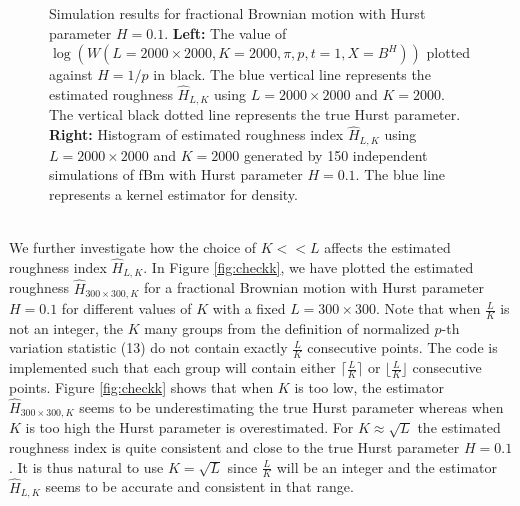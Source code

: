 \documentclass{article}
\begin{document}
\begin{figure}[htbp]
    \caption{Simulation results for fractional Brownian motion with Hurst parameter $H=0.1$. \textbf{Left:} The value of $\log(W(L=2000\times 2000, K=2000, \pi, p, t=1, X=B^H))$ plotted against $H=1/p$ in black. The blue vertical line represents the estimated roughness $\hat{H}_{L,K}$ using $L=2000\times 2000$ and $K=2000$. The vertical black dotted line represents the true Hurst parameter. \textbf{Right:} Histogram of estimated roughness index $\hat{H}_{L,K}$ using $L=2000\times 2000$ and $K=2000$ generated by 150 independent simulations of fBm with Hurst parameter $H=0.1$. The blue line represents a kernel estimator for density. }
    \label{fig:check2000}
\end{figure}\\
We further investigate how the choice of $K<<L$ affects the estimated roughness index $\hat{H}_{L,K}$. In Figure \ref{fig:checkk}, we have plotted the estimated roughness $\hat{H}_{300\times 300,K}$ for a fractional Brownian motion with Hurst parameter $H=0.1$ for different values of $K$ with a fixed $L=300\times 300$. Note that when $\frac{L}{K}$ is not an integer, the $K$ many groups from the definition of normalized $p$-th variation statistic (13) do not contain exactly $\frac{L}{K}$ consecutive points. The code is implemented such that each group will contain either $\lceil \frac{L}{K} \rceil$ or $\lfloor \frac{L}{K} \rfloor$ consecutive points. Figure \ref{fig:checkk} shows that when $K$ is too low, the estimator $\hat{H}_{300\times 300,K}$ seems to be underestimating the true Hurst parameter whereas when $K$ is too high the Hurst parameter is overestimated. For $K\approx \sqrt{L}$ the estimated roughness index is quite consistent and close to the true Hurst parameter $H=0.1$. It is thus natural to use $K=\sqrt{L}$ since $\frac{L}{K}$ will be an integer and the estimator $\hat{H}_{L,K}$ seems to be accurate and consistent in that range.
\end{document}
